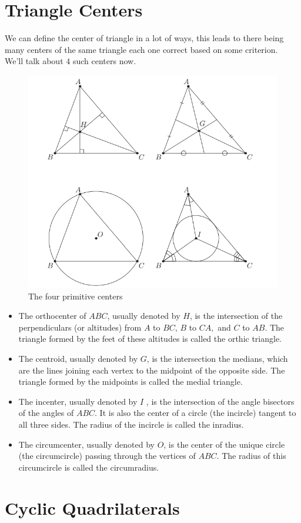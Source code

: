 \section{Triangle Centers}
We can define the center of triangle in a lot of ways, this leads to there being many centers of the same triangle each one correct based on some criterion.\\
We'll talk about $4$ such centers now.\\
\begin{figure}
    \centering
    \includegraphics[width=0.75\linewidth]{Photos/Triangle Centers.png}
    \caption{The four primitive centers}
    
\end{figure}
\begin{definition}
    \begin{itemize}
        \item The orthocenter of $ABC$, usually denoted by $H$, is the intersection of the perpendiculars (or altitudes) from $A$ to $BC$, $B$ to $CA,$ and $C$ to $AB$. The triangle formed by the feet of these altitudes is called the orthic triangle. 
        \item The centroid, usually denoted by $G$, is the intersection the medians, which are the lines joining each vertex to the midpoint of the opposite side. The triangle formed by the midpoints is called the medial triangle.
        \item The incenter, usually denoted by $I$ , is the intersection of the angle bisectors of the angles of $ABC$. It is also the center of a circle (the incircle) tangent to all three sides. The radius of the incircle is called the inradius.
        \item The circumcenter, usually denoted by $O$, is the center of the unique circle (the circumcircle) passing through the vertices of $ABC$. The radius of this circumcircle is called the circumradius. 
    \end{itemize}
\end{definition}

\section{Cyclic Quadrilaterals}
